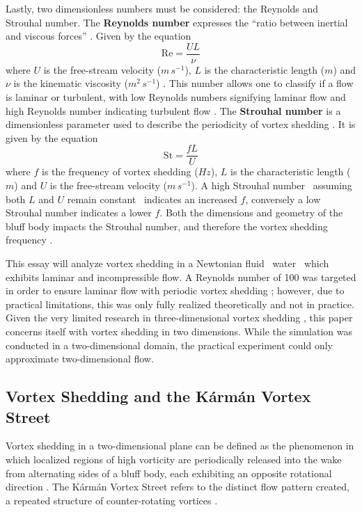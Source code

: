 Lastly, two dimensionless numbers must be considered: the Reynolds and Strouhal number. The \textbf{Reynolds number} expresses the “ratio between inertial and viscous forces” \parencite{nasa_reynolds}. Given by the equation 
\begin{equation}
	\mathrm{Re} = \frac{U L}{\nu}
	\label{eq:reynoldsNumber}
\end{equation}
where $U$ is the free-stream velocity ($m\,s^{-1}$), $L$ is the characteristic length ($m$) and $\nu$ is the kinematic viscosity ($m^2\,s^{-1}$) \parencite{noauthor_relationship_nodate}. This number allows one to classify if a flow is laminar or turbulent, with low Reynolds numbers signifying laminar flow and high Reynolds number indicating turbulent flow \parencite{saldana2024_reynolds}. The \textbf{Strouhal number} is a dimensionless parameter used to describe the periodicity of vortex shedding \parencite[p.~211]{choi2000strouhal}. It is given by the equation 
\begin{equation}
	\mathrm{St} = \frac{f L}{U}
	\label{eq:strouhalNumber}
\end{equation}
where $f$ is the frequency of vortex shedding ($Hz$), $L$ is the characteristic length ($m$) and $U$ is the free-stream velocity ($m\,s^{-1}$). A high Strouhal number \textemdash\ assuming both $L$ and $U$ remain constant \textemdash\ indicates an increased $f$, conversely a low Strouhal number indicates a lower $f$. Both the dimensions and geometry of the bluff body impacts the Strouhal number, and therefore the vortex shedding frequency \parencite[32]{ibrahim_peminggiran_nodate}.

This essay will analyze vortex shedding in a Newtonian fluid \textemdash\ water \textemdash\ which exhibits laminar and incompressible flow. A Reynolds number of 100 was targeted in order to ensure laminar flow with periodic vortex shedding \parencite[2]{alammar_wake_nodate}; however, due to practical limitations, this was only fully realized theoretically and not in practice. Given the very limited research in three-dimensional vortex shedding \parencite[63]{buresti1998}, this paper concerns itself with vortex shedding in two dimensions. While the simulation was conducted in a two-dimensional domain, the practical experiment could only approximate two-dimensional flow.

\subsection{Vortex Shedding and the Kármán Vortex Street}
Vortex shedding in a two-dimensional plane can be defined as the phenomenon in which localized regions of high vorticity are periodically released into the wake from alternating sides of a bluff body, each exhibiting an opposite rotational direction \parencite[156]{green1995fluid}. The Kármán Vortex Street refers to the distinct flow pattern created, a repeated structure of counter-rotating vortices \parencite[26]{govardhan2005karman}.

